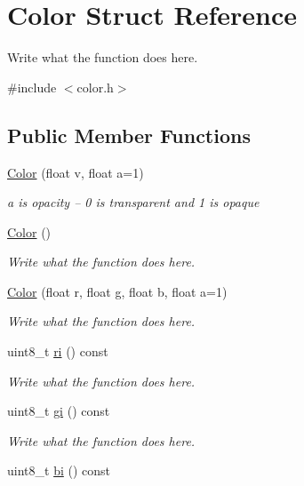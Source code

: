 \hypertarget{structColor}{\section{Color Struct Reference}
\label{structColor}
}


Write what the function does here.  




{\ttfamily \#include $<$color.\+h$>$}

\subsection*{Public Member Functions}
\begin{DoxyCompactItemize}
\item 
\hyperlink{structColor_a132dd3d7d2210a0a62b2631fadcbae00}{Color} (float v, float a=1)
\begin{DoxyCompactList}\small\item\em a is opacity -- 0 is transparent and 1 is opaque \end{DoxyCompactList}\item 
\hyperlink{structColor_a9a742cbe9f9f4037f5d9f4e81a9b2428}{Color} ()
\begin{DoxyCompactList}\small\item\em Write what the function does here. \end{DoxyCompactList}\item 
\hyperlink{structColor_a8e449e810735a4f3d98cc3881de7304f}{Color} (float r, float g, float b, float a=1)
\begin{DoxyCompactList}\small\item\em Write what the function does here. \end{DoxyCompactList}\item 
uint8\+\_\+t \hyperlink{structColor_a96bf23f4f638efd2808bb1382278561e}{ri} () const 
\begin{DoxyCompactList}\small\item\em Write what the function does here. \end{DoxyCompactList}\item 
uint8\+\_\+t \hyperlink{structColor_a54df9605562111b1f13a1a72adcffe8b}{gi} () const 
\begin{DoxyCompactList}\small\item\em Write what the function does here. \end{DoxyCompactList}\item 
uint8\+\_\+t \hyperlink{structColor_aace9cb49f6c4aff8e18a3fd2f5582507}{bi} () const 

\end{DoxyCompactItemize}
